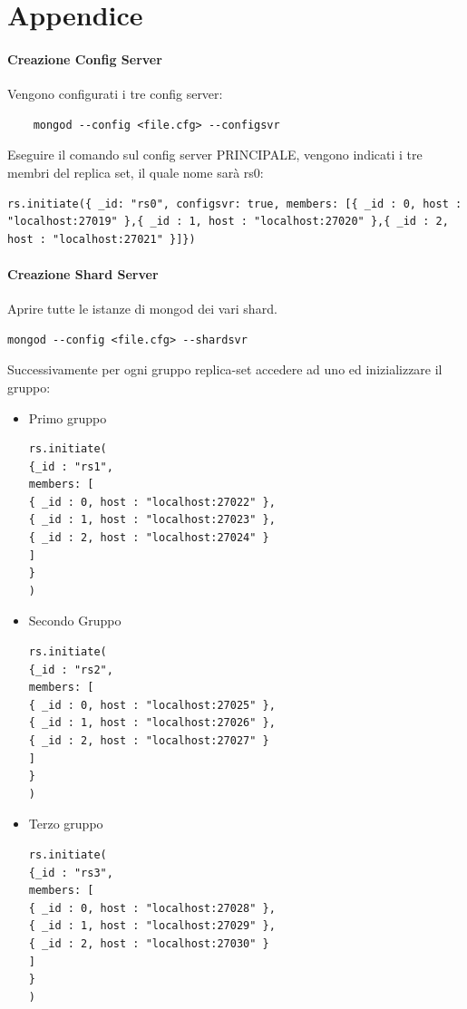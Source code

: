\documentclass[10pt, a4paper,openany]{article}
\begin{document}
\section*{Appendice}

\paragraph{Creazione Config Server\\}
Vengono configurati i tre config server:
\begin{Verbatim}
	mongod --config <file.cfg> --configsvr
\end{Verbatim}

Eseguire il comando sul config server PRINCIPALE, vengono indicati i tre membri del replica set, il quale nome sarà rs0:
\begin{Verbatim}
rs.initiate({ _id: "rs0", configsvr: true, members: [{ _id : 0, host : "localhost:27019" },{ _id : 1, host : "localhost:27020" },{ _id : 2, host : "localhost:27021" }]})
\end{Verbatim}

\paragraph{Creazione Shard Server\\} Aprire tutte le istanze di mongod dei vari shard.

\begin{Verbatim}
mongod --config <file.cfg> --shardsvr
\end{Verbatim}

Successivamente per ogni gruppo replica-set accedere ad uno ed inizializzare il gruppo:
\begin{itemize}
	\item Primo gruppo
\begin{Verbatim}
rs.initiate(
{_id : "rs1",
members: [
{ _id : 0, host : "localhost:27022" },
{ _id : 1, host : "localhost:27023" },
{ _id : 2, host : "localhost:27024" }
]
}
)
\end{Verbatim}
	\item Secondo Gruppo
\begin{Verbatim}
rs.initiate(
{_id : "rs2",
members: [
{ _id : 0, host : "localhost:27025" },
{ _id : 1, host : "localhost:27026" },
{ _id : 2, host : "localhost:27027" }
]
}
)
\end{Verbatim}

	\item Terzo gruppo
\begin{Verbatim}
rs.initiate(
{_id : "rs3",
members: [
{ _id : 0, host : "localhost:27028" },
{ _id : 1, host : "localhost:27029" },
{ _id : 2, host : "localhost:27030" }
]
}
)
\end{Verbatim}

\end{itemize}
\end{document}
